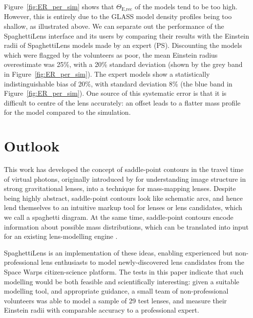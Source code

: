 \documentclass[usenatbib]{mn2e}
\newcommand{\spl}{SpaghettiLens\xspace}
\newcommand{\sw}{Space Warps\xspace}
\newcommand{\ERf}[1][]{$\Theta_\text{E#1}$\xspace} %
\newcommand{\Figref}[1]{Figure~\ref{fig:#1}}
\begin{document}

\Figref{ER_per_sim} shows that \ERf[,rec] of the models tend to be too
high.  However, this is entirely due to the GLASS model density
profiles being too shallow, as illustrated above. We can separate out
the performance of the \spl interface and its users by comparing their
results with the  Einstein radii of \spl models made by an expert
(PS). Discounting the models which were flagged by the volunteers as
poor, the mean Einstein radius overestimate was 25\%, with a 20\%
standard deviation (shown by the grey band in \Figref{ER_per_sim}). 
The expert models show a statistically indistinguishable bias of 20\%,
with standard deviation 8\% (the blue band in \Figref{ER_per_sim}).
One source of this systematic error is that it is difficult to centre
of the lens accurately: an offset leads to a flatter mass profile for
the model compared to the simulation.



\section{Outlook} \label{sec:todo}

This work has developed the concept of saddle-point contours in the
travel time of virtual photons, originally introduced by
\cite{1986ApJ...310..568B} for understanding image structure in strong
gravitational lenses, into a technique for mass-mapping lenses.
Despite being highly abstract, saddle-point contours look like
schematic arcs, and hence lend themselves to an intuitive markup tool
for lenses or lens candidates, which we call a spaghetti diagram.  At
the same time, saddle-point contours encode information about possible
mass distributions, which can be translated into input for an existing
lens-modelling engine \citep[GLASS, by][]{2014arXiv1401.7990C}.

\spl is an implementation of these ideas, enabling experienced but
non-professional lens enthusiasts to model newly-discovered lens
candidates from the \sw citizen-science platform.  The tests in this
paper indicate that such modelling would be both feasible and
scientifically interesting: given a suitable modelling tool, and
appropriate guidance, a small team of non-professional volunteers was
able to model a sample of 29 test lenses, and measure their Einstein
radii with comparable accuracy to a professional expert.
\end{document}
